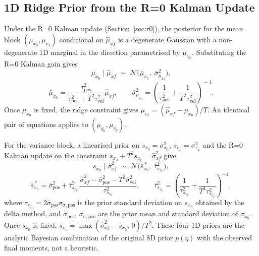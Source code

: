 \documentclass[11pt,a4paper]{article}
\begin{document}
\subsection{1D Ridge Prior from the R=0 Kalman Update}
\label{sec:ridge_prior_gh}

Under the R=0 Kalman update (Section~\ref{sec:r0}), the posterior for the
mean block $(\mu_{x_0},\mu_{v_x})$ conditional on $\hat\mu_{xf}$ is a
degenerate Gaussian with a non-degenerate 1D marginal in the direction
parametrised by $\mu_{x_0}$.  Substituting the R=0 Kalman gain gives
\begin{equation}
  \mu_{x_0}\mid\hat\mu_{xf}
  \;\sim\;
  \mathcal{N}\!\bigl(\bar\mu_{x_0},\;\bar\sigma^2_{\mu_{x_0}}\bigr),
  \label{eq:ridge_prior_mu}
\end{equation}
\begin{equation}
  \bar\mu_{x_0}
  = \frac{\tau_\mathrm{pos}^2}{\tau_\mathrm{pos}^2+T^2\tau_\mathrm{vel}^2}
    \hat\mu_{xf},
  \qquad
  \bar\sigma^2_{\mu_{x_0}}
  = \!\left(\frac{1}{\tau_\mathrm{pos}^2}
    +\frac{1}{T^2\tau_\mathrm{vel}^2}\right)^{\!-1}.
  \label{eq:ridge_prior_mu_params}
\end{equation}
Once $\mu_{x_0}$ is fixed, the ridge constraint gives
$\mu_{v_x}=(\hat\mu_{xf}-\mu_{x_0})/T$.
An identical pair of equations applies to $(\mu_{y_0},\mu_{v_y})$.

For the variance block, a linearised prior on $s_{x_0}=\sigma^2_{x_0}$,
$s_{v_x}=\sigma^2_{v_x}$ and the R=0 Kalman update on the constraint
$s_{x_0}+T^2 s_{v_x}=\hat\sigma^2_{xf}$ give
\begin{equation}
  s_{x_0}\mid\hat\sigma^2_{xf}
  \;\sim\;
  \mathcal{N}\!\bigl(\bar s^{\,*}_{x_0},\;\bar\tau^2_{s_{x_0}}\bigr),
  \label{eq:ridge_prior_var}
\end{equation}
\begin{equation}
  \bar s^{\,*}_{x_0}
  = \bar\sigma_\mathrm{pos}^2
  + \bar\tau^2_{s_{x_0}}\,
    \frac{\hat\sigma^2_{xf}-\bar\sigma_\mathrm{pos}^2-T^2\bar\sigma_\mathrm{vel}^2}
         {\tau^2_{s_{x_0}}},
  \qquad
  \bar\tau^2_{s_{x_0}}
  = \!\left(\frac{1}{\tau^2_{s_{x_0}}}
    +\frac{1}{T^4\tau^2_{s_{v_x}}}\right)^{-1},
  \label{eq:ridge_prior_var_params}
\end{equation}
where $\tau_{s_{x_0}}=2\bar\sigma_\mathrm{pos}\sigma_{\sigma,\mathrm{pos}}$ is
the prior standard deviation on $s_{x_0}$ obtained by the delta method, and
$\bar\sigma_\mathrm{pos}$, $\sigma_{\sigma,\mathrm{pos}}$ are the prior mean
and standard deviation of $\sigma_{x_0}$.  Once $s_{x_0}$ is fixed,
$s_{v_x}=\max(\hat\sigma^2_{xf}-s_{x_0},\,0)/T^2$.  These four 1D priors are
the analytic Bayesian combination of the original 8D prior $p(\eta)$ with the
observed final moments, not a heuristic.
\end{document}
